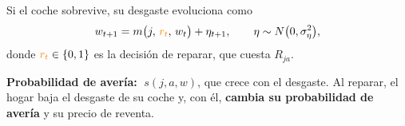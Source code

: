 \documentclass[border=0pt]{standalone}
\newcommand{\no}[1]{{\color{orange}#1}}
\begin{document}
\begin{minipage}{26.783cm}\fontsize{27}{33.5}\selectfont\raggedright 
Si el coche sobrevive, su desgaste evoluciona como
\[ w_{t+1}=m\big(j,\,\no{r_t},\,w_t\big)+\eta_{t+1},\qquad
   \eta\sim N\big(0,\sigma_\eta^2\big), \]
donde $\no{r_t}\in\{0,1\}$ es la decisión de reparar, que cuesta $R_{ja}$.

\textbf{Probabilidad de avería:} $\;s(j,a,w)$, que crece con el desgaste. Al reparar,
el hogar baja el desgaste de su coche y, con él, \textbf{cambia su probabilidad de
avería} y su precio de reventa.
\end{minipage}
\end{document}
